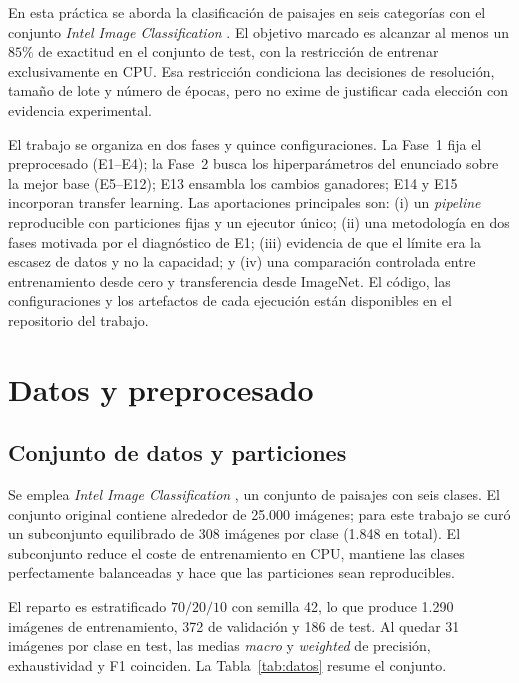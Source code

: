 \documentclass[11pt,a4paper]{article}
\begin{document}
En esta práctica se aborda la clasificación de paisajes en seis categorías con el conjunto \emph{Intel Image Classification} \citep{intel2018image}. El objetivo marcado es alcanzar al menos un $85\%$ de exactitud en el conjunto de test, con la restricción de entrenar exclusivamente en CPU. Esa restricción condiciona las decisiones de resolución, tamaño de lote y número de épocas, pero no exime de justificar cada elección con evidencia experimental.

El trabajo se organiza en dos fases y quince configuraciones. La Fase~1 fija el preprocesado (E1--E4); la Fase~2 busca los hiperparámetros del enunciado sobre la mejor base (E5--E12); E13 ensambla los cambios ganadores; E14 y E15 incorporan transfer learning. Las aportaciones principales son: (i) un \emph{pipeline} reproducible con particiones fijas y un ejecutor único; (ii) una metodología en dos fases motivada por el diagnóstico de E1; (iii) evidencia de que el límite era la escasez de datos y no la capacidad; y (iv) una comparación controlada entre entrenamiento desde cero y transferencia desde ImageNet. El código, las configuraciones y los artefactos de cada ejecución están disponibles en el repositorio del trabajo.

\section{Datos y preprocesado}

\subsection{Conjunto de datos y particiones}

Se emplea \emph{Intel Image Classification} \citep{intel2018image}, un conjunto de paisajes con seis clases. El conjunto original contiene alrededor de 25.000 imágenes; para este trabajo se curó un subconjunto equilibrado de 308 imágenes por clase (1.848 en total). El subconjunto reduce el coste de entrenamiento en CPU, mantiene las clases perfectamente balanceadas y hace que las particiones sean reproducibles.

El reparto es estratificado $70/20/10$ con semilla 42, lo que produce 1.290 imágenes de entrenamiento, 372 de validación y 186 de test. Al quedar 31 imágenes por clase en test, las medias \emph{macro} y \emph{weighted} de precisión, exhaustividad y F1 coinciden. La Tabla~\ref{tab:datos} resume el conjunto.
\end{document}
